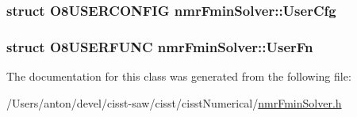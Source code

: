 \subsubsection[{User\+Cfg}]{\setlength{\rightskip}{0pt plus 5cm}struct O8\+U\+S\+E\+R\+C\+O\+N\+F\+I\+G nmr\+Fmin\+Solver\+::\+User\+Cfg\hspace{0.3cm}{\ttfamily [protected]}}\label{classnmr_fmin_solver_a7116a6ed46d966947aaf356e22028a5d}
\hypertarget{classnmr_fmin_solver_aae14c67da4d9b2d740a1adb8873904b3}{}
\subsubsection[{User\+Fn}]{\setlength{\rightskip}{0pt plus 5cm}struct O8\+U\+S\+E\+R\+F\+U\+N\+C nmr\+Fmin\+Solver\+::\+User\+Fn\hspace{0.3cm}{\ttfamily [protected]}}\label{classnmr_fmin_solver_aae14c67da4d9b2d740a1adb8873904b3}


The documentation for this class was generated from the following file\+:\begin{DoxyCompactItemize}
\item 
/\+Users/anton/devel/cisst-\/saw/cisst/cisst\+Numerical/\hyperlink{nmr_fmin_solver_8h}{nmr\+Fmin\+Solver.\+h}\end{DoxyCompactItemize}
